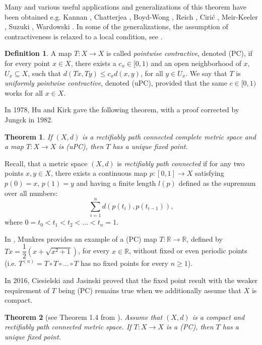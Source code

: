 \documentclass[12 pt]{article}
\theoremstyle{lema}
\theoremstyle{proposition}
\theoremstyle{theorem}
\newtheorem{theorem}{Theorem}[section]
\theoremstyle{theorem}
\theoremstyle{corollary}
\theoremstyle{definition}
\newtheorem{definition}{Definition}[section]
\theoremstyle{example}
\def\r{\mathbb R}
\begin{document}
	Many and various useful applications and generalizations of this theorem have been obtained e.g. Kannan \cite{Kannan}, Chatterjea \cite{Chatterjea}, Boyd-Wong \cite{BoydWong}, Reich \cite{Reich}, Ciri\'c \cite{Ciric, Ciric2}, Meir-Keeler \cite{Meir-Keeler}, Suzuki \cite{Suzuki}, Wardowski \cite{Wardowski}. In some of the generalizations, the assumption of contractiveness is relaxed to a local condition, see \cite{Clarke, Edelstein, Edelstein2, HuKirk, Jungck}.
	
	\begin{definition}
		A map $T: X \to X$ is called \textit{pointwise contractive}, denoted (PC), if for every point $x \in X$, there exists a \(c_x \in [0,1)\) and an open neighborhood of \(x\), \(U_x \subseteq X\), such that \(d(Tx,Ty) \leq c_x d(x,y)\), for all \(y \in U_x\). We say that $T$ is \textit{uniformly pointwise contractive}, denoted (uPC), provided that the same \(c \in [0,1)\) works for all \(x\in X\).
	\end{definition}

	In 1978, Hu and Kirk \cite{HuKirk} gave the following theorem, with a proof corrected by Jungck \cite{Jungck} in 1982.
	
	\begin{theorem}
		If \((X,d)\) is a rectifiably path connected complete metric space and a map \(T : X \to X\) is (uPC), then \(T\) has a unique fixed point.
	\end{theorem}

	Recall, that a metric space \((X,d)\) is \textit{rectifiably path connected} if for any two points \(x,y \in X\), there exists a continuous map \(p: [0,1] \to X\) satisfying \(p(0)=x\), \(p(1)=y\) and having a finite length $l(p)$ defined as the supremum over all numbers:
	\[ \sum_{i=1}^{n} d(p(t_i),p(t_{i-1})),\]
	where \(0=t_0<t_1<t_2< \dots < t_n =1.\)
	
	In \cite{Munkres}, Munkres provides an example of a (PC) map \(T:\r \to \r \), defined by \(Tx= \dfrac12 (x+\sqrt{x^2+1})\), for every \(x \in \r\), without fixed or even periodic points (i.e. \(T^{(n)} = T\circ T \circ \dots \circ T\) has no fixed points for every \(n \geq 1\)).
	
	In 2016, Ciesielski and Jasinski \cite{Cieselski} proved that the fixed point result with the weaker requirement of \(T\) being (PC) remains true when we additionally assume that \(X\) is compact.
	
	\begin{theorem}[see Theorem 1.4 from \cite{Cieselski}]
		Assume that \((X,d)\) is a compact and rectifiably path connected metric space. If \(T : X \to X \) is a (PC), then \(T\) has a unique fixed point. 
	\end{theorem}
\end{document}
